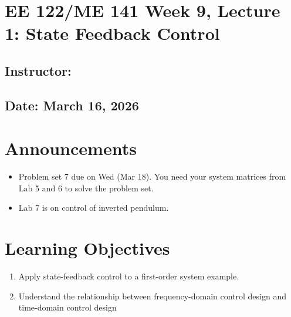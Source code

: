 \documentclass{ee122_notes}
\renewcommand{\releasedate}{March 16, 2026}
\begin{document}
\section*{EE 122/ME 141 Week 9, Lecture 1: State Feedback Control}
\subsection*{Instructor: \instructor}
\subsection*{Date: \releasedate}
\section{Announcements}
\begin{itemize}
    \item Problem set 7 due on Wed (Mar 18). You need your system matrices from Lab 5 and 6 to solve the problem set.
    \item Lab 7 is on control of inverted pendulum. 
\end{itemize}
\section{Learning Objectives}
\begin{enumerate}
    \item Apply state-feedback control to a first-order system example.
    \item Understand the relationship between frequency-domain control design and time-domain control design
\end{enumerate}
\end{document}
